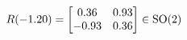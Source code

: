 \documentclass[preview]{standalone}
\begin{document}
\begin{align*}
\special{dvisvgm:raw <g id='unique000'>}R(-1.20) = \begin{bmatrix} 0.36 & 0.93 \\ -0.93 & 0.36 \end{bmatrix} \in \text{SO}(2)\special{dvisvgm:raw </g>}
\end{align*}
\end{document}

